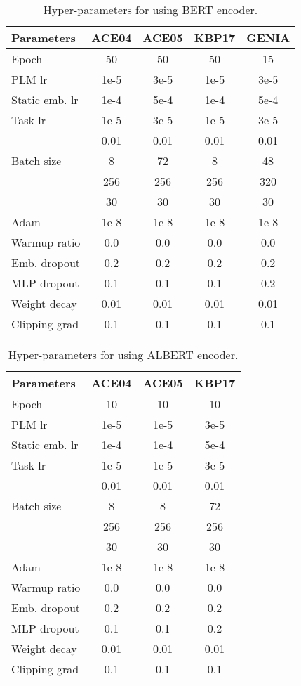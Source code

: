\documentclass[11pt]{article}
\begin{document}
\begin{table}[ht]
\centering
\small
\begin{tabular}{lcccc}
\toprule
Parameters & ACE04 & ACE05 & KBP17 & GENIA \\
\midrule
Epoch & 50 & 50 & 50 & 15 \\
PLM lr & 1e-5 & 3e-5 & 1e-5 & 3e-5 \\
Static emb. lr & 1e-4 & 5e-4 & 1e-4 & 5e-4 \\
Task lr & 1e-5 & 3e-5 & 1e-5 & 3e-5 \\
 & 0.01 & 0.01 & 0.01 & 0.01 \\
Batch size & 8 & 72 &8 & 48 \\
 & 256 & 256 & 256 & 320 \\
 & 30 & 30 & 30 & 30  \\
Adam  & 1e-8 & 1e-8 & 1e-8 & 1e-8\\
Warmup ratio & 0.0 & 0.0 & 0.0 & 0.0   \\
Emb. dropout & 0.2  & 0.2  & 0.2  & 0.2 \\
MLP dropout & 0.1 & 0.1 & 0.1 & 0.2 \\
Weight decay & 0.01 & 0.01 & 0.01 & 0.01 \\
Clipping grad & 0.1 & 0.1 & 0.1 & 0.1 \\
\bottomrule
\end{tabular}
\caption{Hyper-parameters for using BERT encoder.
}
\label{hyper para}
\end{table}

\begin{table}[ht]
\centering
\small
\begin{tabular}{lccc}
\toprule
Parameters & ACE04 & ACE05 & KBP17 \\
\midrule
Epoch & 10 & 10 & 10 \\
PLM lr & 1e-5 & 1e-5 & 3e-5 \\
Static emb. lr & 1e-4 & 1e-4  & 5e-4 \\
Task lr & 1e-5 & 1e-5  & 3e-5 \\
 & 0.01 & 0.01 & 0.01\\
Batch size & 8 & 8 & 72 \\
 & 256 & 256 & 256 \\
 & 30 & 30 & 30 \\
Adam  & 1e-8 & 1e-8 & 1e-8  \\
Warmup ratio &  0.0 & 0.0 & 0.0 \\
Emb. dropout &0.2  & 0.2  & 0.2 \\
MLP dropout & 0.1 & 0.1  & 0.2 \\
Weight decay & 0.01 & 0.01 & 0.01 \\
Clipping grad &0.1 & 0.1 & 0.1 \\
\bottomrule
\end{tabular}
\caption{Hyper-parameters for using ALBERT encoder.
}
\label{hyper para albert}
\end{table}
\end{document}
